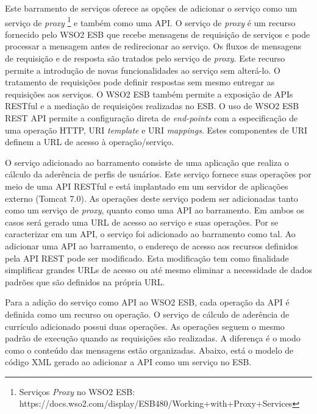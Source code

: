 Este barramento de serviços oferece as opções de adicionar o serviço como um serviço de \textit{proxy} \footnote{Serviços \textit{Proxy} no WSO2 ESB: https://docs.wso2.com/display/ESB480/Working+with+Proxy+Services} e também como uma API. O serviço de \textit{proxy} é um recurso fornecido pelo WSO2 ESB que recebe mensagens de requisição de serviços e pode processar a mensagem antes de redirecionar ao serviço. Os fluxos de mensagens de requisição e de resposta são tratados pelo serviço de \textit{proxy}. Este recurso permite a introdução de novas funcionalidades ao serviço sem alterá-lo. O tratamento de requisições pode definir respostas sem mesmo entregar as requisições aos serviços. O WSO2 ESB também permite a exposição de APIs RESTful e a mediação de requisições realizadas no ESB. O uso de WSO2 ESB REST API permite a configuração direta de \textit{end-points} com a especificação de uma operação HTTP, URI \textit{template} e URI \textit{mappings}. Estes componentes de URI definem a URL de acesso à operação/serviço.

O serviço adicionado ao barramento consiste de uma aplicação que realiza o cálculo da aderência de perfis de usuários. Este serviço fornece suas operações por meio de uma API RESTful e está implantado em um servidor de aplicações externo (Tomcat 7.0). As operações deste serviço podem ser adicionadas tanto como um serviço de \textit{proxy}, quanto como uma API ao barramento. Em ambos os casos será gerado uma URL de acesso ao serviço e suas operações. Por se caracterizar em um API, o serviço foi adicionado ao barramento como tal. Ao adicionar uma API ao barramento, o endereço de acesso aos recursos definidos pela API REST pode ser modificado. Esta modificação tem como finalidade simplificar grandes URLs de acesso ou até mesmo eliminar a necessidade de dados padrões que são definidos na própria URL.

Para a adição do serviço como API ao WSO2 ESB, cada operação da API é definida como um recurso ou operação. O serviço de cálculo de aderência de currículo adicionado possui duas operações. As operações seguem o mesmo padrão de execução quando as requisições são realizadas. A diferença é o modo como o conteúdo das mensagens estão organizadas. Abaixo, está o modelo de código XML gerado ao adicionar a API como um serviço no ESB.


